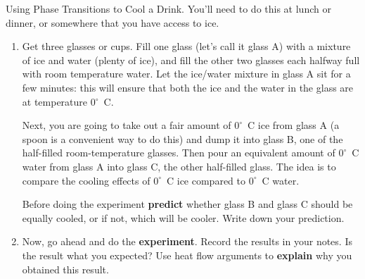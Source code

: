 \begin{aproblem}{Using Phase Transitions to Cool a Drink.}  
  You'll need to do this at lunch or dinner, or somewhere that you
  have access to ice.
  \begin{enumerate}
  \item Get three glasses or cups.  Fill one glass (let's call it
    glass A) with a mixture of ice and water (plenty of ice), and fill
    the other two glasses each halfway full with room temperature
    water.  Let the ice/water mixture in glass A sit for a few
    minutes: this will ensure that both the ice and the water in the
    glass are at temperature 0$^\circ$~C.

    Next, you are going to take out a fair amount of $0^\circ$~C ice
    from glass A (a spoon is a convenient way to do this) and dump it
    into glass B, one of the half-filled room-temperature glasses.
    Then pour an equivalent amount of $0^\circ$~C water from glass A
    into glass C, the other half-filled glass.  The idea is to compare
    the cooling effects of $0^\circ$~C ice compared to $0^\circ$~C
    water.

    Before doing the experiment {\bf predict} whether glass B and
    glass C should be equally cooled, or if not, which will be cooler.
    Write down your prediction.

  \item Now, go ahead and do the {\bf experiment}.  Record the results
    in your notes.  Is the result what you expected?  Use heat flow
    arguments to {\bf explain} why you obtained this result.

  \end{enumerate}

\end{aproblem}


